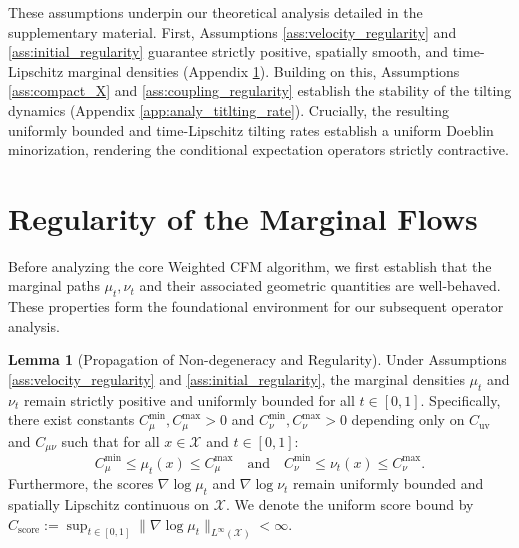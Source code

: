 \documentclass[11pt]{article}
\theoremstyle{definition}
\newtheorem{lemma}[theorem]{Lemma}
\numberwithin{equation}{section}%
\begin{document}
{These assumptions underpin our theoretical analysis detailed in the supplementary material. First, Assumptions \ref{ass:velocity_regularity} and \ref{ass:initial_regularity} guarantee strictly positive, spatially smooth, and time-Lipschitz marginal densities (Appendix \ref{app:reg_marginal_flows}). Building on this, Assumptions \ref{ass:compact_X} and \ref{ass:coupling_regularity} establish the stability of the tilting dynamics (Appendix \ref{app:analy_titlting_rate}). Crucially, the resulting uniformly bounded and time-Lipschitz tilting rates establish a uniform Doeblin minorization, rendering the conditional expectation operators strictly contractive.


\section{Regularity of the Marginal Flows}
\label{app:reg_marginal_flows}
Before analyzing the core Weighted CFM algorithm, we first establish that the marginal paths $\mu_t, \nu_t$ and their associated geometric quantities are well-behaved. These properties form the foundational environment for our subsequent operator analysis.
\begin{lemma}[Propagation of Non-degeneracy and Regularity]
\label{lem:density_bounds}
Under Assumptions \ref{ass:velocity_regularity} and \ref{ass:initial_regularity}, the marginal densities $\mu_t$ and $\nu_t$ remain strictly positive and uniformly bounded for all $t \in [0,1]$. Specifically, there exist constants $C_{\mu}^{\min}, C_{\mu}^{\max} > 0$ and $C_{\nu}^{\min}, C_{\nu}^{\max} > 0$ depending only on $C_{\mathrm{uv}}$ and $C_{\mu \nu}$ such that for all $x \in \mathcal{X}$ and $t \in [0,1]$:
\begin{equation*}
C_{\mu}^{\min} \le \mu_t(x) \le C_{\mu}^{\max} \quad \text{and} \quad C_{\nu}^{\min} \le \nu_t(x) \le C_{\nu}^{\max}.
\end{equation*}
Furthermore, the scores $\nabla \log \mu_t$ and $\nabla \log \nu_t$ remain uniformly bounded and spatially Lipschitz continuous on $\mathcal{X}$. We denote the uniform score bound by $C_{\mathrm{score}} := \sup_{t\in[0,1]}\|\nabla\log\mu_t\|_{L^\infty(\mathcal{X})} < \infty$.
\end{lemma}

}
\end{document}
